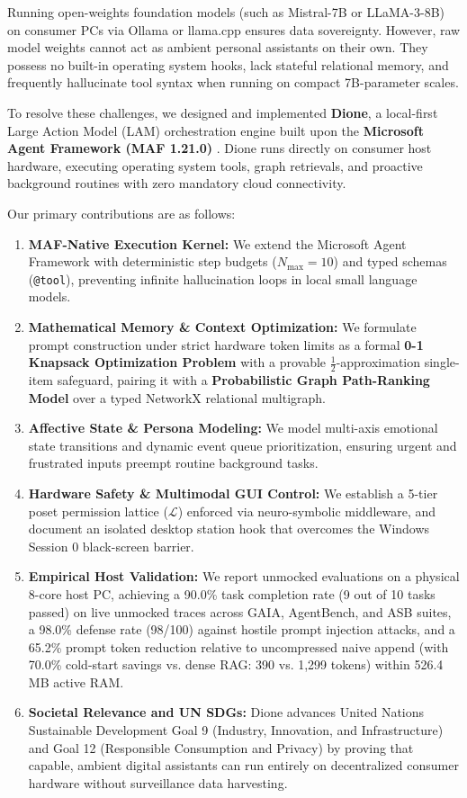 \documentclass[conference,a4paper]{IEEEtran}
\begin{document}
Running open-weights foundation models (such as Mistral-7B or LLaMA-3-8B) on consumer PCs via Ollama or llama.cpp ensures data sovereignty. However, raw model weights cannot act as ambient personal assistants on their own. They possess no built-in operating system hooks, lack stateful relational memory, and frequently hallucinate tool syntax when running on compact 7B-parameter scales.

To resolve these challenges, we designed and implemented \textbf{Dione}, a local-first Large Action Model (LAM) orchestration engine built upon the \textbf{Microsoft Agent Framework (MAF 1.21.0)} \cite{microsoft2025agentframework}. Dione runs directly on consumer host hardware, executing operating system tools, graph retrievals, and proactive background routines with zero mandatory cloud connectivity.

Our primary contributions are as follows:
\begin{enumerate}
    \item \textbf{MAF-Native Execution Kernel:} We extend the Microsoft Agent Framework with deterministic step budgets ($N_{\text{max}} = 10$) and typed schemas (\texttt{@tool}), preventing infinite hallucination loops in local small language models.
    \item \textbf{Mathematical Memory \& Context Optimization:} We formulate prompt construction under strict hardware token limits as a formal \textbf{0-1 Knapsack Optimization Problem} with a provable $\frac{1}{2}$-approximation single-item safeguard, pairing it with a \textbf{Probabilistic Graph Path-Ranking Model} over a typed NetworkX relational multigraph.
    \item \textbf{Affective State \& Persona Modeling:} We model multi-axis emotional state transitions and dynamic event queue prioritization, ensuring urgent and frustrated inputs preempt routine background tasks.
    \item \textbf{Hardware Safety \& Multimodal GUI Control:} We establish a 5-tier poset permission lattice ($\mathcal{L}$) enforced via neuro-symbolic middleware, and document an isolated desktop station hook that overcomes the Windows Session 0 black-screen barrier.
    \item \textbf{Empirical Host Validation:} We report unmocked evaluations on a physical 8-core host PC, achieving a 90.0\% task completion rate (9 out of 10 tasks passed) on live unmocked traces across GAIA, AgentBench, and ASB suites, a 98.0\% defense rate (98/100) against hostile prompt injection attacks, and a 65.2\% prompt token reduction relative to uncompressed naive append (with 70.0\% cold-start savings vs. dense RAG: 390 vs. 1,299 tokens) within 526.4\,MB active RAM.
    \item \textbf{Societal Relevance and UN SDGs:} Dione advances United Nations Sustainable Development Goal 9 (Industry, Innovation, and Infrastructure) and Goal 12 (Responsible Consumption and Privacy) by proving that capable, ambient digital assistants can run entirely on decentralized consumer hardware without surveillance data harvesting.
\end{enumerate}
\end{document}
